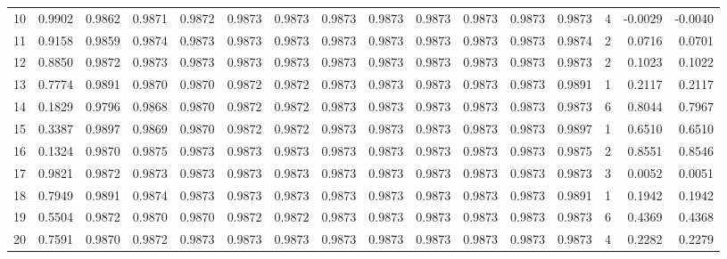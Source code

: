 \begin{tabular}{lrrrrrrrrrrrrrrr}
10  &      0.9902 &  0.9862 &  0.9871 &  0.9872 &  0.9873 &  0.9873 &  0.9873 &  0.9873 &  0.9873 &  0.9873 &   0.9873 &     0.9873 &      4 &                   -0.0029 &                    -0.0040 \\
11  &      0.9158 &  0.9859 &  0.9874 &  0.9873 &  0.9873 &  0.9873 &  0.9873 &  0.9873 &  0.9873 &  0.9873 &   0.9873 &     0.9874 &      2 &                    0.0716 &                     0.0701 \\
12  &      0.8850 &  0.9872 &  0.9873 &  0.9873 &  0.9873 &  0.9873 &  0.9873 &  0.9873 &  0.9873 &  0.9873 &   0.9873 &     0.9873 &      2 &                    0.1023 &                     0.1022 \\
13  &      0.7774 &  0.9891 &  0.9870 &  0.9870 &  0.9872 &  0.9872 &  0.9873 &  0.9873 &  0.9873 &  0.9873 &   0.9873 &     0.9891 &      1 &                    0.2117 &                     0.2117 \\
14  &      0.1829 &  0.9796 &  0.9868 &  0.9870 &  0.9872 &  0.9872 &  0.9873 &  0.9873 &  0.9873 &  0.9873 &   0.9873 &     0.9873 &      6 &                    0.8044 &                     0.7967 \\
15  &      0.3387 &  0.9897 &  0.9869 &  0.9870 &  0.9872 &  0.9872 &  0.9873 &  0.9873 &  0.9873 &  0.9873 &   0.9873 &     0.9897 &      1 &                    0.6510 &                     0.6510 \\
16  &      0.1324 &  0.9870 &  0.9875 &  0.9873 &  0.9873 &  0.9873 &  0.9873 &  0.9873 &  0.9873 &  0.9873 &   0.9873 &     0.9875 &      2 &                    0.8551 &                     0.8546 \\
17  &      0.9821 &  0.9872 &  0.9873 &  0.9873 &  0.9873 &  0.9873 &  0.9873 &  0.9873 &  0.9873 &  0.9873 &   0.9873 &     0.9873 &      3 &                    0.0052 &                     0.0051 \\
18  &      0.7949 &  0.9891 &  0.9874 &  0.9873 &  0.9873 &  0.9873 &  0.9873 &  0.9873 &  0.9873 &  0.9873 &   0.9873 &     0.9891 &      1 &                    0.1942 &                     0.1942 \\
19  &      0.5504 &  0.9872 &  0.9870 &  0.9870 &  0.9872 &  0.9872 &  0.9873 &  0.9873 &  0.9873 &  0.9873 &   0.9873 &     0.9873 &      6 &                    0.4369 &                     0.4368 \\
20  &      0.7591 &  0.9870 &  0.9872 &  0.9873 &  0.9873 &  0.9873 &  0.9873 &  0.9873 &  0.9873 &  0.9873 &   0.9873 &     0.9873 &      4 &                    0.2282 &                     0.2279 \\

\end{tabular}
